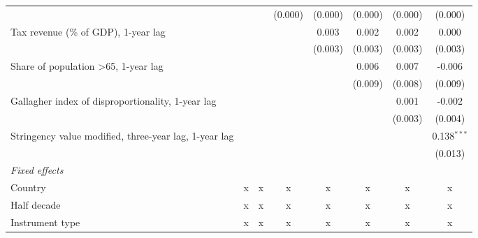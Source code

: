 \begin{tabular}{lccccccc}
                                                                          &                &               & (0.000)       & (0.000)       & (0.000)       & (0.000)       & (0.000)\\   
   Tax revenue (\% of GDP), 1-year lag                                    &                &               &               & 0.003         & 0.002         & 0.002         & 0.000\\   
                                                                          &                &               &               & (0.003)       & (0.003)       & (0.003)       & (0.003)\\   
   Share of population >65, 1-year lag                                    &                &               &               &               & 0.006         & 0.007         & -0.006\\   
                                                                          &                &               &               &               & (0.009)       & (0.008)       & (0.009)\\   
   Gallagher index of disproportionality, 1-year lag                      &                &               &               &               &               & 0.001         & -0.002\\   
                                                                          &                &               &               &               &               & (0.003)       & (0.004)\\   
   Stringency value modified, three-year lag, 1-year lag                  &                &               &               &               &               &               & 0.138$^{***}$\\   
                                                                          &                &               &               &               &               &               & (0.013)\\   
   \emph{Fixed effects}\\
   Country                                                                & x              & x             & x             & x             & x             & x             & x\\  
   Half decade                                                            & x              & x             & x             & x             & x             & x             & x\\  
   Instrument type                                                        & x              & x             & x             & x             & x             & x             & x\\  

\end{tabular}
